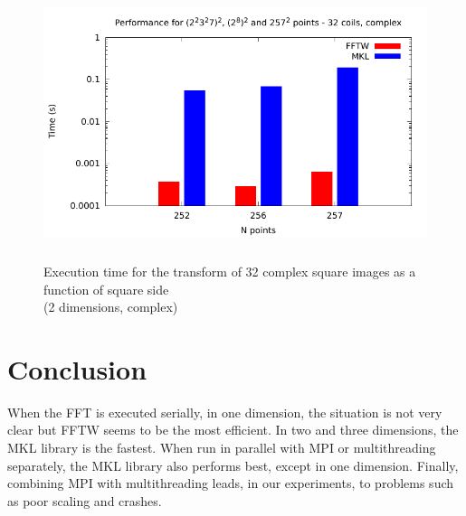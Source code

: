 \documentclass[12pt, a4paper]{article}
\begin{document}
\begin{figure}[H]
\captionsetup{width=0.6\textwidth}
\centering
\includegraphics[height=8cm]{graphs/ccppetmr.pdf}
\caption{Execution time for the transform of 32 complex square images as a function of square side\\(2 dimensions, complex)}
\label{method}
\end{figure}
\section{Conclusion}
When the FFT is executed serially, in one dimension, the situation is not very clear but FFTW seems to be the most efficient. In two and three dimensions, the MKL library is the fastest. When run in parallel with MPI or multithreading separately, the MKL library also performs best, except in one dimension. Finally, combining MPI with multithreading leads, in our experiments, to problems such as poor scaling and crashes.  
\end{document}
